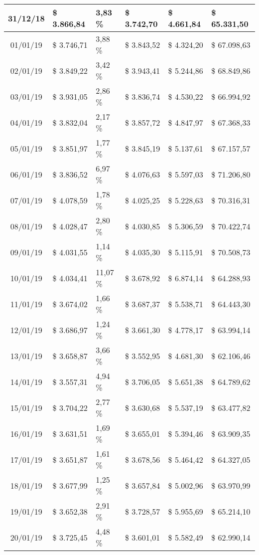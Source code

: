 \begin{small}
\begin{longtable}{|c|l|l|l|l|l|}
31/12/18 & \$ 3.866,84 & 3,83 \% & \$ 3.742,70 & \$ 4.661,84 & \$ 65.331,50 \\ \hline
01/01/19 & \$ 3.746,71 & 3,88 \% & \$ 3.843,52 & \$ 4.324,20 & \$ 67.098,63 \\ \hline
02/01/19 & \$ 3.849,22 & 3,42 \% & \$ 3.943,41 & \$ 5.244,86 & \$ 68.849,86 \\ \hline
03/01/19 & \$ 3.931,05 & 2,86 \% & \$ 3.836,74 & \$ 4.530,22 & \$ 66.994,92 \\ \hline
04/01/19 & \$ 3.832,04 & 2,17 \% & \$ 3.857,72 & \$ 4.847,97 & \$ 67.368,33 \\ \hline
05/01/19 & \$ 3.851,97 & 1,77 \% & \$ 3.845,19 & \$ 5.137,61 & \$ 67.157,57 \\ \hline
06/01/19 & \$ 3.836,52 & 6,97 \% & \$ 4.076,63 & \$ 5.597,03 & \$ 71.206,80 \\ \hline
07/01/19 & \$ 4.078,59 & 1,78 \% & \$ 4.025,25 & \$ 5.228,63 & \$ 70.316,31 \\ \hline
08/01/19 & \$ 4.028,47 & 2,80 \% & \$ 4.030,85 & \$ 5.306,59 & \$ 70.422,74 \\ \hline
09/01/19 & \$ 4.031,55 & 1,14 \% & \$ 4.035,30 & \$ 5.115,91 & \$ 70.508,73 \\ \hline
10/01/19 & \$ 4.034,41 & 11,07 \% & \$ 3.678,92 & \$ 6.874,14 & \$ 64.288,93 \\ \hline
11/01/19 & \$ 3.674,02 & 1,66 \% & \$ 3.687,37 & \$ 5.538,71 & \$ 64.443,30 \\ \hline
12/01/19 & \$ 3.686,97 & 1,24 \% & \$ 3.661,30 & \$ 4.778,17 & \$ 63.994,14 \\ \hline
13/01/19 & \$ 3.658,87 & 3,66 \% & \$ 3.552,95 & \$ 4.681,30 & \$ 62.106,46 \\ \hline
14/01/19 & \$ 3.557,31 & 4,94 \% & \$ 3.706,05 & \$ 5.651,38 & \$ 64.789,62 \\ \hline
15/01/19 & \$ 3.704,22 & 2,77 \% & \$ 3.630,68 & \$ 5.537,19 & \$ 63.477,82 \\ \hline
16/01/19 & \$ 3.631,51 & 1,69 \% & \$ 3.655,01 & \$ 5.394,46 & \$ 63.909,35 \\ \hline
17/01/19 & \$ 3.651,87 & 1,61 \% & \$ 3.678,56 & \$ 5.464,42 & \$ 64.327,05 \\ \hline
18/01/19 & \$ 3.677,99 & 1,25 \% & \$ 3.657,84 & \$ 5.002,96 & \$ 63.970,99 \\ \hline
19/01/19 & \$ 3.652,38 & 2,91 \% & \$ 3.728,57 & \$ 5.955,69 & \$ 65.214,10 \\ \hline
20/01/19 & \$ 3.725,45 & 4,48 \% & \$ 3.601,01 & \$ 5.582,49 & \$ 62.990,14 \\ \hline

\end{longtable}
\end{small}
